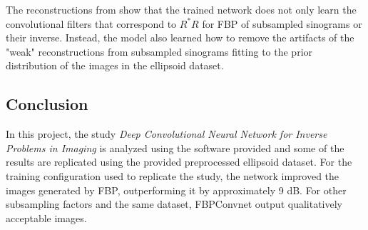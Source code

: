 \documentclass[journal, onecolumn, 11pt]{IEEEtran}
\begin{document}
The reconstructions from  show that the trained network does not only learn the convolutional filters that correspond to $R^\ast R$ for FBP of subsampled sinograms or their inverse. Instead, the model also learned how to remove the artifacts of the "weak" reconstructions from subsampled sinograms fitting to the prior distribution of the images in the ellipsoid dataset. 

\subsection{Conclusion}

In this project, the study \textit{Deep Convolutional Neural Network for Inverse Problems in Imaging} is analyzed using the software provided and some of the results are replicated using the provided preprocessed ellipsoid dataset. For the training configuration used to replicate the study, the network improved the images generated by FBP, outperforming it by approximately 9 dB. For other subsampling factors and the same dataset, FBPConvnet output qualitatively acceptable images. 
\clearpage
\printbibliography
\end{document}
